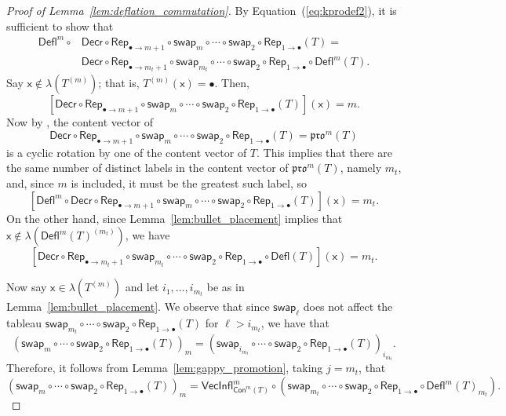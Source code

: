 \documentclass[12pt]{amsart}
\newcommand{\x}{\ensuremath{\mathsf{x}}}
\theoremstyle{definition}
\theoremstyle{remark}
\numberwithin{equation}{section}
\newcommand{\pro}{\mathfrak{pro}}
\newcommand{\swap}{\ensuremath{\mathsf{swap}}}
\newcommand{\decr}{\ensuremath{\mathsf{Decr}}}
\newcommand{\rep}{\ensuremath{\mathsf{Rep}}}
\newcommand{\deflate}{\ensuremath{\mathsf{Defl}}}
\newcommand{\inflate}{\ensuremath{\mathsf{VecInfl}}}
\newcommand{\content}{\ensuremath{\mathsf{Con}}}
\begin{document}
\begin{proof}[Proof of Lemma~\ref{lem:deflation_commutation}]
By Equation~(\ref{eq:kprodef2}), it is sufficient to show that
\begin{align*}
\deflate^m \circ &\decr \circ \rep_{\bullet \rightarrow m+1} \circ \swap_m \circ \cdots \circ \swap_2\circ \rep_{1 \rightarrow \bullet} (T) = \\
 & \decr \circ \rep_{\bullet \rightarrow m_t+1} \circ \swap_{m_t} \circ \cdots \circ \swap_2 \circ \rep_{1 \rightarrow \bullet} \circ \deflate^m (T). 
\end{align*}
Say $\x \not \in \lambda(T^{(m)})$; that is,  $T^{(m)}(\x) = \bullet$.  Then,
\[
[\decr \circ \rep_{\bullet \rightarrow m+1} \circ \swap_m \circ \cdots \circ \swap_2 \circ \rep_{1 \rightarrow \bullet} (T)](\x) = m.
\]
Now by \cite[Lemma~2.1]{DPS}, the content vector of  
\[
\decr \circ \rep_{\bullet \rightarrow m+1} \circ \swap_m \circ \cdots \circ \swap_2 \circ \rep_{1 \rightarrow \bullet} (T) = \pro^m(T)
\]
 is a cyclic rotation by one of the content vector of $T$. This implies that there are the same number of distinct labels in the content vector of $\pro^m(T)$, namely $m_t$, and, since $m$ is included, it must be the greatest such label, so 
 \[
 [\deflate^m \circ \decr \circ \rep_{\bullet \rightarrow m+1} \circ \swap_m \circ \cdots \circ \swap_2 \circ \rep_{1 \rightarrow \bullet} (T)](\x) = m_t.
 \]
  On the other hand, since Lemma~\ref{lem:bullet_placement} implies that $\x \not \in \lambda(\deflate^m(T)^{(m_t)})$, we have
  \[
  [\decr \circ \rep_{\bullet \rightarrow m_t + 1} \circ \swap_{m_t} \circ \cdots \circ \swap_2 \circ \rep_{1 \rightarrow \bullet} \circ \deflate(T)](\x) = m_t.
  \] 

Now say $\x \in \lambda(T^{(m)})$ and let $i_1, \ldots, i_{m_t}$ be as in Lemma~\ref{lem:bullet_placement}. We observe that since $\swap_\ell$ does not affect the tableau $\swap_{m_t} \circ \cdots \circ \swap_2 \circ \rep_{1 \rightarrow \bullet} (T)$ for $\ell > i_{m_t}$, we have that
\[ (\swap_m \circ \cdots \circ \swap_2 \circ \rep_{1 \rightarrow \bullet}( T ))_m = (\swap_{i_{m_t}} \circ \cdots \circ \swap_2 \circ \rep_{1 \rightarrow \bullet}( T ))_{i_{m_t}}.  \]
Therefore, it follows from Lemma~\ref{lem:gappy_promotion}, taking $j = m_t$, that 
\[ (\swap_m \circ \cdots \circ \swap_2 \circ \rep_{1 \rightarrow \bullet}( T ))_m = \inflate^m_{\content^m(T)} \circ (\swap_{m_t} \circ \cdots \circ   \swap_2  \circ \rep_{1 \rightarrow \bullet} \circ \deflate^m(T)_{m_t}). \]


\end{proof}
\end{document}

